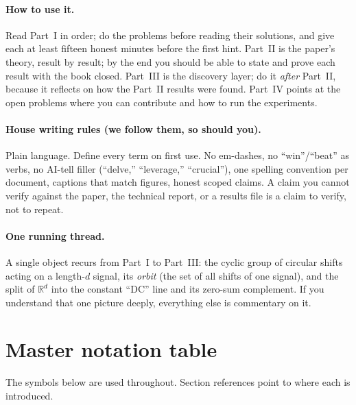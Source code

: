\documentclass[11pt]{article}
\theoremstyle{plain}
\theoremstyle{definition}
\theoremstyle{remark}
\newcommand{\R}{\mathbb{R}}
\begin{document}
\paragraph{How to use it.} Read Part~I in order; do the problems before reading their solutions, and give each at
least fifteen honest minutes before the first hint. Part~II is the paper's theory, result by result; by the end
you should be able to state and prove each result with the book closed. Part~III is the discovery layer; do it
\emph{after} Part~II, because it reflects on how the Part~II results were found. Part~IV points at the open
problems where you can contribute and how to run the experiments.

\paragraph{House writing rules (we follow them, so should you).} Plain language. Define every term on first use.
No em-dashes, no ``win''/``beat'' as verbs, no AI-tell filler (``delve,'' ``leverage,'' ``crucial''), one spelling
convention per document, captions that match figures, honest scoped claims. A claim you cannot verify against the
paper, the technical report, or a results file is a claim to verify, not to repeat.

\paragraph{One running thread.} A single object recurs from Part~I to Part~III: the cyclic group of circular shifts
acting on a length-$d$ signal, its \emph{orbit} (the set of all shifts of one signal), and the split of $\R^d$ into
the constant ``DC'' line and its zero-sum complement. If you understand that one picture deeply, everything else is
commentary on it.

\newpage
\tableofcontents
\newpage

\section{Master notation table}
The symbols below are used throughout. Section references point to where each is introduced.
\end{document}
